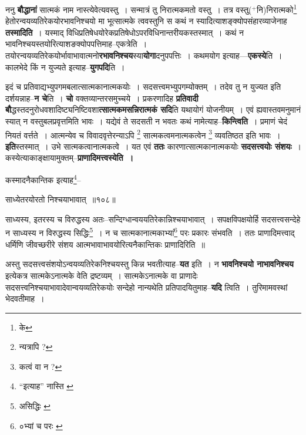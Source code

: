 \documentclass[article,12pt,a4paper]{memoir}
\newcommand{\add}[1]{($^{+}$#1)}
\begin{document}
	  \pstart ननु \textbf{बौद्धानां} सात्मकं नाम नास्त्येवेत्यवस्तु । सन्मात्रं तु निरात्मकमतो वस्तु । तत्र वस्तु\add{नि}निरात्मको\footnote{के} हेतोरन्वयव्यतिरेकयोरभावनिश्चयो मा भूत्सात्मके त्ववस्तुनि स कथं न स्यादित्याशङ्क्योपसंहारव्याजेनाह \textbf{तस्मादिति} । यस्माद् विधिप्रतिषेधयोरेकप्रतिषेधोऽपरविधिनान्तरीयकस्तस्मात् । कथं न भावनिश्चयस्तयोरित्याशङक्योपपत्तिमाह--एकत्रेति । तयोरन्वयव्यतिरेकयोर्भावाभावात्मनो\textbf{रभावनिश्चय}स्या\textbf{योगा}दनुपपत्तिः । कथमयोग इत्याह—\textbf{एकस्ये}ति । कालभेदे किं न युज्यते इत्याह--\textbf{युगपदि}ति ।
	\pend
      

	  \pstart इदं च प्रतिवाद्यभ्युपगमबलात्सात्मकानात्मकयोः । सदसत्त्वमभ्युपगम्योक्तम् । तदेव तु न युज्यत इति दर्शयन्नाह--\textbf{न चे}ति । \textbf{चो} वक्तव्यान्तरसमुच्चये । प्रकरणादिह \textbf{प्रतिवादी बौ}द्धस्तदनुरोधवशादिष्ट्यनिष्टिवशा\textbf{त्सात्मकमसन्निरात्मकं सदि}ति यथायोगं योजनीयम् । एवं ह्यवास्तवमनुमानं स्यात् न वस्तुबलप्रवृत्तमिति भावः । यद्येवं ते सदसती न भवतः कथं नामेत्याह--\textbf{किन्त्विति} । प्रमाणं चेदं नियतं वर्त्तते । आत्मन्येव च विवादवृत्तेरन्याऽपि \footnote{न्यत्रापि ?} सात्मकत्वमनात्मकत्वेन \footnote{कत्वं वा न ?} व्यवतिष्ठत इति भावः । \textbf{इति}स्तस्मात् । उभे सात्मकत्वानात्मकत्वे । यत एवं \textbf{ततः} कारणात्सात्मकानात्मकयोः \textbf{सदसत्त्वयोः संशयः} । कस्येत्याकाङ्क्षायामुक्तम्--\textbf{प्राणादिमत्त्वस्येति ।}
	\pend
	  \bigskip
	  \begingroup
	

	  \pstart कस्मादनैकान्तिक इत्याह\footnote{“इत्याह” नास्ति \cite{dp-msA} \cite{dp-msB} \cite{dp-msC} \cite{dp-msD} \cite{dp-edP} \cite{dp-edH} \cite{dp-edN}}\---
	\pend
       
	  \bigskip
	  \begingroup
	

	  \pstart साध्येतरयोरतो निश्चयाभावात् ॥१०८॥
	\pend
      
	  \endgroup
	 

	  \pstart साध्यस्य, इतरस्य च विरुद्धस्य अतः--सन्दिग्धान्वययतिरेकान्निश्चयाभावात् । सपक्षविपक्षयोर्हि सदसत्त्वसन्देहे न साध्यस्य न विरुद्धस्य सिद्धिः\footnote{असिद्धिः \cite{dp-msB}} । न च सात्मकानात्मकाभ्यां\footnote{०भ्यां च परः \cite{dp-msA} \cite{dp-msB} \cite{dp-edP} \cite{dp-edH} \cite{dp-edN}} परः प्रकारः संभवति । ततः प्राणादिमत्त्वाद् धर्मिणि जीवच्छरीरे संशय आत्मभावाभावयोरित्यनैकान्तिकः प्राणादिरिति ॥
	\pend
      
	  \endgroup
	

	  \pstart अस्तु सदसत्त्वसंशयोऽन्वयव्यतिरेकनिश्चयस्तु किन्न भवतीत्याह--\textbf{यत} इति । न \textbf{भावनिश्चयो नाभावनिश्चय} इत्येकत्र सात्मकेऽनात्मके वेति द्रष्टव्यम् । सात्मकेऽनात्मके वा प्राणादेः सदसत्त्वनिश्चयाभावादेवान्वयव्यतिरेकयोः सन्देहो नान्यथेति प्रतिपादयितुमाह--\textbf{यदि} त्विति । तुरिमामवस्थां भेदवतीमाह ।
	\pend
      
\end{document}
